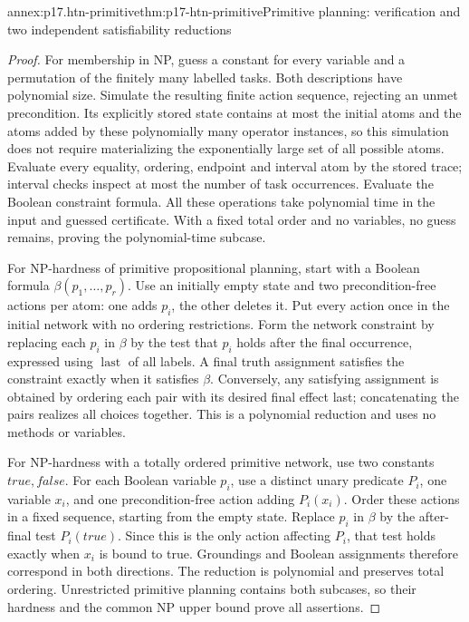 \begin{annexitem}{annex:p17.htn-primitive}{thm:p17-htn-primitive}{Primitive planning: verification and two independent satisfiability reductions}
\begin{proof}
For membership in NP, guess a constant for every variable and a permutation
of the finitely many labelled tasks. Both descriptions have polynomial size.
Simulate the resulting finite action sequence, rejecting an unmet precondition.
Its explicitly stored state contains at most the initial atoms and the atoms
added by these polynomially many operator instances, so this simulation does
not require materializing the exponentially large set of all possible atoms.
Evaluate every equality, ordering, endpoint and interval atom by the stored
trace; interval checks inspect at most the number of task occurrences.
Evaluate the Boolean constraint formula. All these operations take polynomial
time in the input and guessed certificate. With a fixed total order and no
variables, no guess remains, proving the polynomial-time subcase.

For NP-hardness of primitive propositional planning, start with a Boolean
formula \(\beta(p_1,\ldots,p_r)\). Use an initially empty state and two
precondition-free actions per atom: one adds \(p_i\), the other deletes it.
Put every action once in the initial network with no ordering restrictions.
Form the network constraint by replacing each \(p_i\) in \(\beta\) by
the test that \(p_i\) holds after the final occurrence, expressed using
\(\operatorname{last}\) of all labels. A final truth assignment satisfies
the constraint exactly when it satisfies \(\beta\). Conversely, any
satisfying assignment is obtained by ordering each pair with its desired
final effect last; concatenating the pairs realizes all choices together.
This is a polynomial reduction and uses no methods or variables.

For NP-hardness with a totally ordered primitive network, use two constants
\(\mathit{true},\mathit{false}\). For each Boolean variable \(p_i\), use
a distinct unary predicate \(P_i\), one variable \(x_i\), and one
precondition-free action adding \(P_i(x_i)\). Order these actions in a
fixed sequence, starting from the empty state. Replace \(p_i\) in
\(\beta\) by the after-final test \(P_i(\mathit{true})\). Since this
is the only action affecting \(P_i\), that test holds exactly when
\(x_i\) is bound to true. Groundings and Boolean assignments therefore
correspond in both directions. The reduction is polynomial and preserves
total ordering. Unrestricted primitive planning contains both subcases,
so their hardness and the common NP upper bound prove all assertions.
\end{proof}
\end{annexitem}

